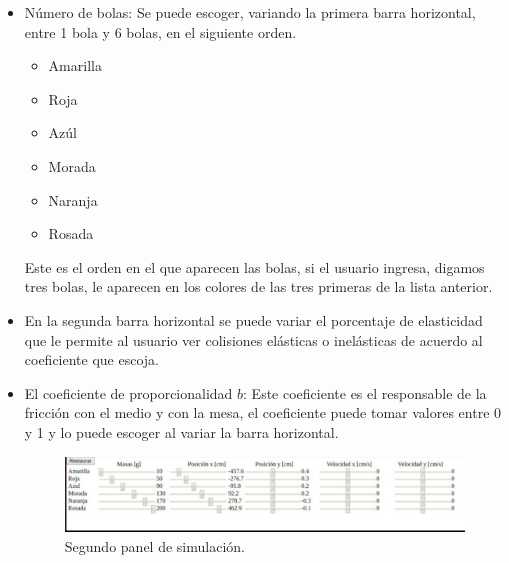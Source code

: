 \documentclass{article}
\begin{document}
\begin{itemize}
     \item Número de bolas: Se puede escoger, variando la primera barra horizontal, entre 1 bola y 6 bolas, en el siguiente orden. 
    \begin{itemize} \item Amarilla \item Roja \item Azúl \item Morada \item Naranja \item Rosada
    \end{itemize}
     Este es el orden en el que aparecen las bolas, si el usuario ingresa, digamos tres bolas, le aparecen en los colores de las tres primeras de la lista anterior. 
    
   
    \item En la segunda barra horizontal se puede variar el porcentaje de elasticidad que le permite al usuario ver colisiones elásticas o inelásticas de acuerdo al coeficiente que escoja.
    \item El coeficiente de proporcionalidad $b$: Este coeficiente es el responsable de la fricción con el medio y con la mesa, el coeficiente puede tomar valores entre 0 y 1 y lo puede escoger al variar la barra horizontal.  
    
    \begin{figure}[h]
\includegraphics[width=\linewidth]{lab2.jpeg}
\caption{Segundo panel de simulación.}
\end{figure}


\end{itemize}
\end{document}
